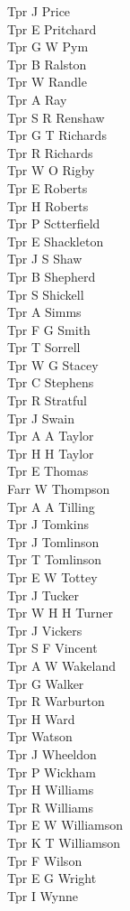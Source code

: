 \begin{multicols}{2}
  Tpr J Price \\
  Tpr E Pritchard \\
  Tpr G W Pym \\
  Tpr B Ralston \\
  Tpr W Randle \\
  Tpr A Ray \\
  Tpr S R Renshaw \\
  Tpr G T Richards \\
  Tpr R Richards \\
  Tpr W O Rigby \\
  Tpr E Roberts \\
  Tpr H Roberts \\
  Tpr P Sctterfield \\
  Tpr E Shackleton \\
  Tpr J S Shaw \\
  Tpr B Shepherd \\
  Tpr S Shickell \\
  Tpr A Simms \\
  Tpr F G Smith \\
  Tpr T Sorrell \\
  Tpr W G Stacey \\
  Tpr C Stephens \\
  Tpr R Stratful \\
  Tpr J Swain \\
  Tpr A A Taylor \\
  Tpr H H Taylor \\
  Tpr E Thomas \\
  Farr W Thompson \\
  Tpr A A Tilling \\
  Tpr J Tomkins \\
  Tpr J Tomlinson \\
  Tpr T Tomlinson \\
  Tpr E W Tottey \\
  Tpr J Tucker \\
  Tpr W H H Turner \\
  Tpr J Vickers \\
  Tpr S F Vincent \\
  Tpr A W Wakeland \\
  Tpr G Walker \\
  Tpr R Warburton \\
  Tpr H Ward \\
  Tpr Watson \\
  Tpr J Wheeldon \\
  Tpr P Wickham \\
  Tpr H Williams \\
  Tpr R Williams \\
  Tpr E W Williamson \\
  Tpr K T Williamson \\
  Tpr F Wilson \\
  Tpr E G Wright \\
  Tpr I Wynne \\
\end{multicols}
